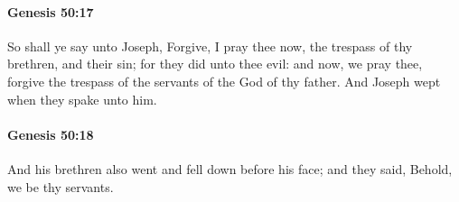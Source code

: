 		\paragraph{Genesis 50:17} %
			\label{GENESIS-50-17}

			So shall ye say unto Joseph, Forgive, I pray thee now, the trespass of thy brethren, and their sin; for they did unto thee evil: and now, we pray thee, forgive the trespass of the servants of the God of thy father. And Joseph wept when they spake unto him.


		\paragraph{Genesis 50:18} %
			\label{GENESIS-50-18}

			And his brethren also went and fell down before his face; and they said, Behold, we be thy servants.

